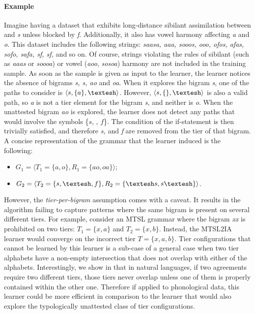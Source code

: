 \paragraph{Example}
Imagine having a dataset that exhibits long-distance sibilant assimilation between \emph{\textesh} and \emph{s} unless blocked by \emph{f}.
Additionally, it also has vowel harmony affecting \emph{a} and \emph{o}.
This dataset includes the following strings: \emph{saasa, \textesh a\textesh aa, sooos, o\textesh o\textesh o, \textesh ofos, \textesh afas, sofo\textesh, safa\textesh, sf\textesh, sf\textesh,} and so on.
Of course, strings violating the rules of sibilant (such as \emph{\textesh aa\textesh as} or \emph{so\textesh ooa}) or vowel (\emph{a\textesh oo}, \emph{sosoa}) harmony are not included in the training sample.
As soon as the sample is given as input to the learner, the learner notices the absence of bigrams \emph{s\textesh , \textesh s, ao} and \emph{oa}.
When it explores the bigram \emph{s\textesh}, one of the paths to consider is $\langle s, \{a\}, \textrm{\textesh}\rangle$.
However, $\langle s, \{\}, \textrm{\textesh}\rangle$ is also a valid path, so \emph{a} is not a tier element for the bigram \emph{s\textesh}, and neither is \emph{o}.
When the unattested bigram \emph{ao} is explored, the learner does not detect any paths that would involve the symbols \{$s$, \textesh, $f$\}.
The condition of the if-statement is then trivially satisfied, and therefore \emph{s, \textesh} and \emph{f} are removed from the tier of that bigram.
A concise representation of the grammar that the learner induced is the following:

\begin{itemize}
	\item $G_1 = \langle T_1 = \{a, o\}, R_1 = \{ao, oa\}\rangle$;
	\item $G_2 = \langle T_2 = \{s, \textrm{\textesh}, f\}, R_2 = \{\textrm{\textesh}s, s\textrm{\textesh}\}\rangle$.
\end{itemize}

However, the \emph{tier-per-bigram} assumption comes with a caveat.
It results in the algorithm failing to capture patterns where the same bigram is present on several different tiers.
For example, consider an MTSL grammar where the bigram \emph{xx} is prohibited on two tiers: $T_1 = \{x, a\}$ and $T_2 = \{x, b\}$.
Instead, the MTSL$2$IA learner would converge on the incorrect tier $T = \{x, a, b\}$.
Tier configurations that cannot be learned by this learner is a sub-case of a general case when two tier alphabets have a non-empty intersection that does not overlap with either of the alphabets.
Interestingly, we show in \citet{AksenovaDeshmukh2018} that in natural languages, if two agreements require two different tiers, those tiers never overlap unless one of them is properly contained within the other one.
Therefore if applied to phonological data, this learner could be more efficient in comparison to the learner that would also explore the typologically unattested class of tier configurations.

